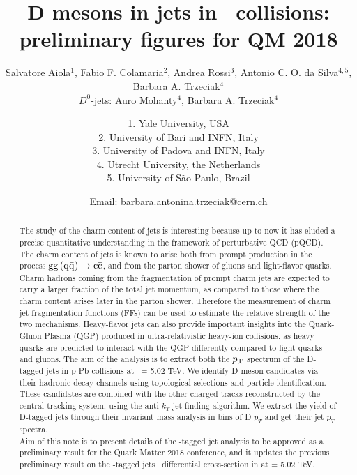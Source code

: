 \documentclass[ALICE,manyauthors]{ALICE_analysis_notes}
\begin{document}
%
%
%
\begin{titlepage}
%
\PHdate{\today}
%
\title{D mesons in jets in \pPb\ collisions: preliminary figures for QM 2018}
%
\author{Salvatore Aiola$^{1}$, Fabio F. Colamaria$^{2}$, Andrea Rossi$^{3}$, Antonio C. O. da Silva$^{4,5}$, Barbara A. Trzeciak$^{4}$\\
$D^{0}$-jets: Auro Mohanty$^{4}$, Barbara A. Trzeciak$^{4}$}
\author{
1. Yale University, USA\\
2. University of Bari and INFN, Italy\\
3. University of Padova and INFN, Italy\\
4. Utrecht University, the Netherlands\\
5. University of S\~ao Paulo, Brazil\\
}
\author{Email: barbara.antonina.trzeciak@cern.ch}
%
%
\begin{abstract}
The study of the charm content of jets is interesting because up to now
it has eluded a precise quantitative understanding in the framework of perturbative QCD (pQCD).
The charm content of jets is known to arise both from prompt production in the process ${\rm gg\, (q\bar{q})} \rightarrow {\rm c\bar{c}}$, and
from the parton shower of gluons and light-flavor quarks.
Charm hadrons coming from the fragmentation of prompt charm jets 
are expected to carry a larger fraction of the total jet momentum,
as compared to those where the charm content arises later in the
parton shower. Therefore the measurement of charm jet fragmentation functions (FFs) 
can be used to estimate the relative strength of the two mechanisms.
Heavy-flavor jets can also provide important insights into the Quark-Gluon Plasma (QGP)
produced in ultra-relativistic heavy-ion collisions, as heavy quarks are predicted
to interact with the QGP differently compared to light quarks and gluons. 
The aim of the analysis is to extract both the $p_{\rm T}$ spectrum of the D-tagged jets in p-Pb collisions at \snn\ = 5.02 TeV. 
We identify D-meson candidates via their hadronic decay channels using topological selections and particle identification. These 
candidates are combined with the other charged tracks reconstructed by the central tracking system, using the anti-$k_T$ jet-finding algorithm. 
We extract the yield of D-tagged jets through their invariant mass analysis in bins of D $p_T$ and get their jet $p_T$ spectra.  \\
Aim of this note is to present details of the \Dzero-tagged jet analysis to be approved as a preliminary result for the Quark Matter 2018 conference, and it updates the previous preliminary result on the \Dstar-tagged jets \pt\ differential cross-section in \pPb at \snn = 5.02 TeV.
\end{abstract}
\end{titlepage}
%
\tableofcontents

\newpage
\begin{appendices}

\end{appendices}
%
\end{document}
